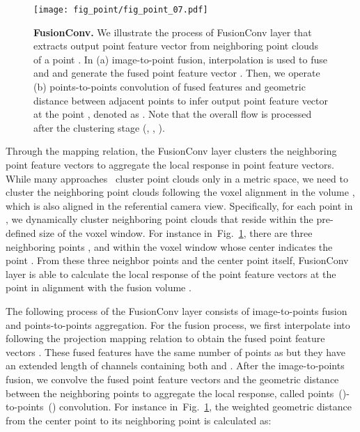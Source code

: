 \documentclass[letterpaper, 10 pt, conference]{ieeeconf}
\newcommand{\Fref}[1]{Fig.~\textcolor{blue}{\ref{#1}}}
\begin{document}
\begin{figure}[!t]
    \vspace{+3mm}
    \centering
    \texttt{[image: fig\_point/fig\_point\_07.pdf]}
\caption{\textbf{FusionConv.} 
    We illustrate the process of FusionConv layer that extracts output point feature vector  from neighboring point clouds  of a point . 
    In (a) image-to-point fusion, interpolation is used to fuse  and  and generate the fused point feature vector .
    Then, we operate (b) points-to-points convolution of fused features  and geometric distance  between adjacent points  to infer output point feature vector at the point , denoted as .
    Note that the overall flow is processed after the clustering stage {(, , ).}
    }
    \label{fig:fig_point}
\end{figure}


Through the mapping relation, the FusionConv layer clusters the neighboring point feature vectors to aggregate the local response in point feature vectors. While many approaches~\cite{continuous_conv,point_conv,dynamic_graph_conv,interp_conv} cluster point clouds  only in a metric space, we need to cluster the neighboring point clouds following the voxel alignment in the volume , which is also aligned in the referential camera view. Specifically, for each point  in , we dynamically cluster neighboring point clouds  
that reside within the pre-defined size of the voxel window. For instance in~\Fref{fig:fig_point}, there are three neighboring points ,  and  within the voxel window whose center indicates the point . From these three neighbor points and the center point  itself, FusionConv layer is able to calculate the local response of the point feature vectors at the point  in alignment with the fusion volume .


The following process of the FusionConv layer consists of image-to-points fusion and points-to-points aggregation. For the fusion process, we first interpolate  into  following the projection mapping relation to obtain the fused point feature vectors . These fused features  have the same number of points as  but they have an extended length of channels containing both  and . After the image-to-points fusion, we convolve the fused point feature vectors  and the geometric distance between the neighboring points  to aggregate the local response, called points~()-to-points~({}) convolution. For instance in~\Fref{fig:fig_point}, the weighted geometric distance  from the center point  to its neighboring point  is calculated as:
\end{document}
